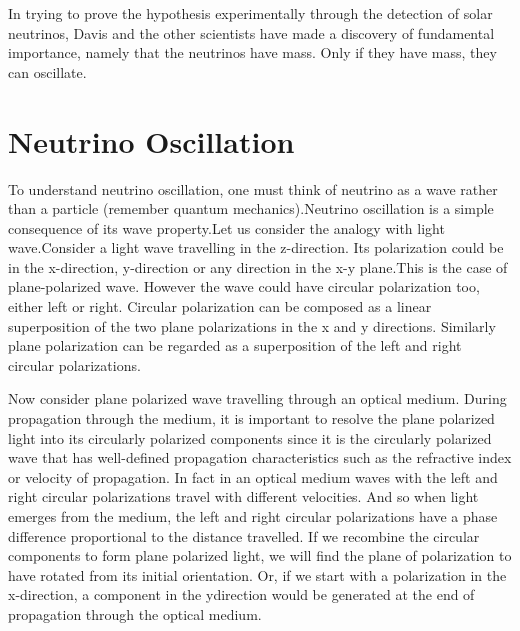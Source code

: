 In trying to prove the hypothesis experimentally through the detection of
solar neutrinos, Davis and the other scientists have made a discovery of
fundamental importance, namely that the neutrinos have mass. Only if they
have mass, they can oscillate.

\section{Neutrino Oscillation}

To understand neutrino oscillation, one must think of neutrino as a wave
rather than a particle (remember quantum mechanics).Neutrino oscillation
is a simple consequence of its wave property.Let us consider the analogy with
light wave.Consider a light wave travelling in the z-direction. Its polarization
could be in the x-direction, y-direction or any direction in the x-y plane.This
is the case of plane-polarized wave. However the wave could have circular
polarization too, either left or right. Circular polarization can be composed as
a linear superposition of the two plane polarizations in the x and y directions.
Similarly plane polarization can be regarded as a superposition of the left and
right circular polarizations.

Now consider plane polarized wave travelling through an optical medium.
During propagation through the medium, it is important to resolve the plane
polarized light into its circularly polarized components since it is the circularly polarized wave that has well-defined propagation characteristics such as
the refractive index or velocity of propagation. In fact in an optical medium
waves with the left and right circular polarizations travel with different velocities. And so when light emerges from the medium, the left and right circular
polarizations have a phase difference proportional to the distance travelled.
If we recombine the circular components to form plane polarized light, we
will find the plane of polarization to have rotated from its initial orientation.
Or, if we start with a polarization in the x-direction, a component in the ydirection would be generated at the end of propagation through the optical
medium.

